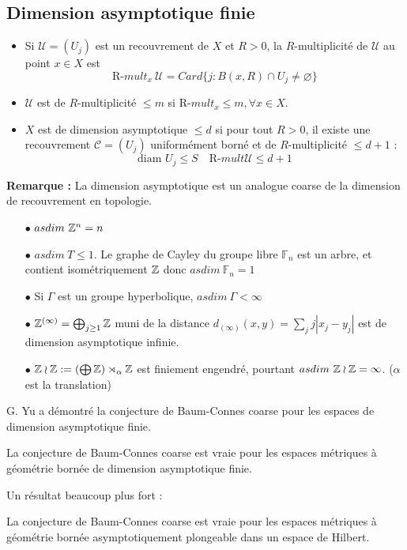 \documentclass{beamer}
\begin{document}
\subsection{Dimension asymptotique finie}

\begin{frame}
\begin{definition}
\begin{itemize}
\item Si $\mathcal U=(U_j)$ est un recouvrement de $X$ et $R>0$, la $R$-multiplicité de $\mathcal U$ au point $x\in X$ est
\[\text{R-}mult_x\ \mathcal U=Card\{j : B(x,R)\cap U_j \neq \varnothing\}\]
\item $\mathcal U $ est de $R$-multiplicité $\leq m$ si $\text{R-}mult_x\leq m,\forall x\in X$.
\item $X$ est de dimension asymptotique $\leq d$ si pour tout $R>0$, il existe une recouvrement $\mathcal C=(U_j)$ uniformément borné et de $R$-multiplicité $\leq d+1$ :
\[\text{diam }U_j \leq S\quad \text{R-}mult \mathcal U \leq d+1\]
\end{itemize}
\end{definition}
\textbf{Remarque :} La dimension asymptotique est un analogue coarse de la dimension de recouvrement en topologie.\\

\end{frame}

\begin{frame}
\begin{itemize}
\item[$\bullet$] $asdim\ \mathbb Z^n=n$
\item[$\bullet$] $asdim\ T \leq 1$. Le graphe de Cayley du groupe libre $\mathbb F_n$ est un arbre, et contient isométriquement $\mathbb Z$ donc $asdim\ \mathbb F_n= 1$ 
\item[$\bullet$] Si $\Gamma$ est un groupe hyperbolique, $asdim \ \Gamma <\infty$
\item[$\bullet$] $\mathbb Z^{(\infty)}=\bigoplus_{j\geq 1} \mathbb Z$ muni de la distance $d_{(\infty)}(x,y)=\sum_j j|x_j-y_j|$ est de dimension asymptotique infinie. 
\item[$\bullet$] $\mathbb Z \wr \mathbb Z :=(\bigoplus\mathbb Z)\rtimes_\alpha \mathbb Z$ est finiement engendré, pourtant $asdim\ \mathbb Z\wr \mathbb Z =\infty$. ($\alpha$ est la translation)
\end{itemize}
\end{frame}

\begin{frame}
G. Yu a démontré la conjecture de Baum-Connes coarse pour les espaces de dimension asymptotique finie.
\begin{thm}[G. Yu '98]
La conjecture de Baum-Connes coarse est vraie pour les espaces métriques à géométrie bornée de dimension asymptotique finie. 
\end{thm}
 Un résultat beaucoup plus fort :
\begin{thm}[G. Yu '00]
La conjecture de Baum-Connes coarse est vraie pour les espaces métriques à géométrie bornée asymptotiquement plongeable dans un espace de Hilbert. 
\end{thm}
\end{frame}
\end{document}
